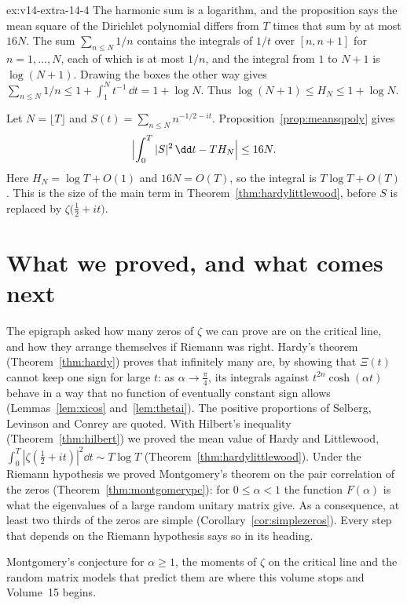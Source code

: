 \begin{solution}{ex:v14-extra-14-4}
\idea The harmonic sum is a logarithm, and the proposition says the mean square of the Dirichlet polynomial differs from $T$ times that sum by at most $16N$.
\writeup The sum $\sum_{n\le N}1/n$ contains the integrals of $1/t$ over $[n,n+1]$ for $n=1,\dots,N$, each of which is at most $1/n$, and the integral from $1$ to $N+1$ is $\log(N+1)$. Drawing the boxes the other way gives $\sum_{n\le N}1/n\le1+\int_1^N t^{-1}\,\dd t=1+\log N$. Thus $\log(N+1)\le H_N\le1+\log N$.

Let $N=\lfloor T\rfloor$ and $S(t)=\sum_{n\le N}n^{-1/2-it}$. Proposition~\ref{prop:meansqpoly} gives
\[
\Bigl|\int_0^T|S|^2\,\dd t-TH_N\Bigr|\le16N.
\]
Here $H_N=\log T+O(1)$ and $16N=O(T)$, so the integral is $T\log T+O(T)$. This is the size of the main term in Theorem~\ref{thm:hardylittlewood}, before $S$ is replaced by $\zeta\bigl(\frac12+it\bigr)$.
\end{solution}

\section{What we proved, and what comes next}

The epigraph asked how many zeros of $\zeta$ we can prove are on the critical line, and how they arrange themselves if Riemann was right. Hardy's theorem (Theorem~\ref{thm:hardy}) proves that infinitely many are, by showing that $\Xi(t)$ cannot keep one sign for large $t$: as $\alpha\to\frac\pi4$, its integrals against $t^{2n}\cosh(\alpha t)$ behave in a way that no function of eventually constant sign allows (Lemmas~\ref{lem:xicos} and~\ref{lem:thetai}). The positive proportions of Selberg, Levinson and Conrey are quoted. With Hilbert's inequality (Theorem~\ref{thm:hilbert}) we proved the mean value of Hardy and Littlewood, $\int_0^T|\zeta(\frac12+it)|^2\dd t\sim T\log T$ (Theorem~\ref{thm:hardylittlewood}). Under the Riemann hypothesis we proved Montgomery's theorem on the pair correlation of the zeros (Theorem~\ref{thm:montgomerypc}): for $0\le\alpha<1$ the function $F(\alpha)$ is what the eigenvalues of a large random unitary matrix give. As a consequence, at least two thirds of the zeros are simple (Corollary~\ref{cor:simplezeros}). Every step that depends on the Riemann hypothesis says so in its heading.

Montgomery's conjecture for $\alpha\ge1$, the moments of $\zeta$ on the critical line and the random matrix models that predict them are where this volume stops and Volume~15 begins.

